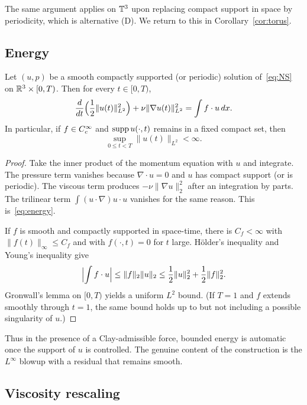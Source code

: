 \begin{remark}
The same argument applies on $\mathbb{T}^3$ upon replacing compact support in space by periodicity, which is alternative (D). We return to this in Corollary~\ref{cor:torus}.
\end{remark}

\subsection{Energy}

\begin{lemma}
\label{lem:energy}
Let $(u,p)$ be a smooth compactly supported (or periodic) solution of~\eqref{eq:NS} on $\mathbb{R}^3\times[0,T)$. Then for every $t\in[0,T)$,
\begin{equation}
\label{eq:energy}
\frac{d}{dt}\Bigl(\frac12\|u(t)\|_{L^2}^2\Bigr)+\nu\|\nabla u(t)\|_{L^2}^2
=\int f\cdot u\,dx.
\end{equation}
In particular, if $f\in C_c^\infty$ and $\operatorname{supp} u(\cdot,t)$ remains in a fixed compact set, then
\[
\sup_{0\le t<T}\|u(t)\|_{L^2}<\infty.
\]
\end{lemma}

\begin{proof}
Take the inner product of the momentum equation with $u$ and integrate. The pressure term vanishes because $\nabla\cdot u=0$ and $u$ has compact support (or is periodic). The viscous term produces $-\nu\|\nabla u\|_2^2$ after an integration by parts. The trilinear term $\int (u\cdot\nabla)u\cdot u$ vanishes for the same reason. This is~\eqref{eq:energy}.

If $f$ is smooth and compactly supported in space-time, there is $C_f<\infty$ with $\|f(t)\|_\infty\le C_f$ and with $f(\cdot,t)=0$ for $t$ large. {H}\"older's inequality and {Y}oung's inequality give
\[
\Bigl|\int f\cdot u\Bigr|
\le \|f\|_2\|u\|_2
\le \frac12\|u\|_2^2+\frac12\|f\|_2^2.
\]
{G}ronwall's lemma on $[0,T)$ yields a uniform $L^2$ bound. (If $T=1$ and $f$ extends smoothly through $t=1$, the same bound holds up to but not including a possible singularity of $u$.)
\end{proof}

Thus in the presence of a {C}lay-admissible force, bounded energy is automatic once the support of $u$ is controlled. The genuine content of the construction is the $L^\infty$ blowup with a residual that remains smooth.

\subsection{Viscosity rescaling}

